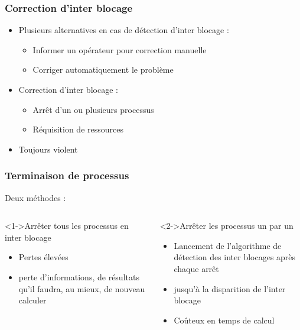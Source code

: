 \begin{frame}
\frametitle{Correction d’inter blocage}
\begin{itemize}
\item Plusieurs alternatives en cas de détection d’inter blocage :
\begin{itemize}
\item Informer un opérateur pour correction manuelle
\item Corriger automatiquement le problème
\end{itemize}
\item Correction d’inter blocage :
\begin{itemize}
\item Arrêt d’un ou plusieurs processus
\item Réquisition de ressources
\end{itemize}
\item Toujours violent
\end{itemize}
\end{frame}

\begin{frame}
\frametitle{Terminaison de processus}
Deux méthodes :
\begin{columns}
\begin{block}<1->{Arrêter tous les processus en inter blocage}
\begin{itemize}
\item Pertes élevées
\item perte d’informations, de résultats qu’il faudra, au mieux, de nouveau calculer
\end{itemize}
\end{block}
\begin{block}<2->{Arrêter les processus un par un}
\begin{itemize}
\item Lancement de l’algorithme de détection des inter blocages après chaque arrêt
\item jusqu’à la disparition de l’inter blocage
\item Coûteux en temps de calcul
\end{itemize}
\end{block}
\end{columns}
\end{frame}

